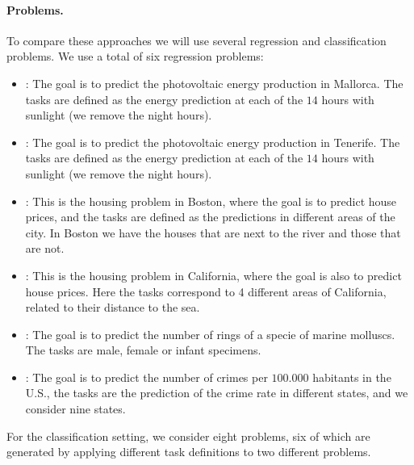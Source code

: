 \paragraph*{Problems.}
To compare these approaches we will use several regression and classification problems. We use a total of six regression problems:
\begin{itemize}
    \item {}: The goal is to predict the photovoltaic energy production in Mallorca. The tasks are defined as the energy prediction at each of the $14$ hours with sunlight (we remove the night hours).
    \item {}: The goal is to predict the photovoltaic energy production in Tenerife. The tasks are defined as the energy prediction at each of the $14$ hours with sunlight (we remove the night hours).
    \item {}: This is the housing problem in Boston, where the goal is to predict house prices, and the tasks are defined as the predictions in different areas of the city. In Boston we have the houses that are next to the river and those that are not.
    \item {}: This is the housing problem in California, where the goal is also to predict house prices. Here the tasks correspond to 4 different areas of California, related to their distance to the sea.
    \item {}: The goal is to predict the number of rings of a specie of marine molluscs. The tasks are male, female or infant specimens.
    \item {}: The goal is to predict the number of crimes per $100.000$ habitants in the U.S., the tasks are the prediction of the crime rate in different states, and we consider nine states.
\end{itemize}
For the classification setting, we consider eight problems, six of which are generated by applying different task definitions to two different problems.
